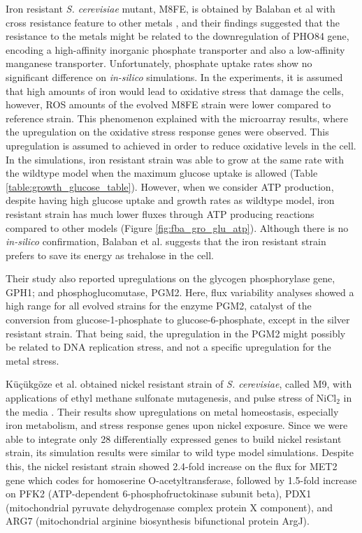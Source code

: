 Iron resistant \emph{S. cerevisiae} mutant, M8FE, is obtained by Balaban et al with cross resistance feature to other metals \cite{balaban2020evolutionary}, and their findings suggested that the resistance to the metals might be related to the downregulation of PHO84 gene, encoding a high-affinity inorganic phosphate transporter and also a low-affinity manganese transporter. Unfortunately, phosphate uptake rates show no significant difference on \emph{in-silico} simulations. In the experiments, it is assumed that high amounts of iron would lead to oxidative stress that damage the cells, however, ROS amounts of the evolved M8FE strain were lower compared to reference strain. This phenomenon explained with the microarray results, where the upregulation on the oxidative stress response genes were observed. This upregulation is assumed to achieved in order to reduce oxidative levels in the cell. In the simulations, iron resistant strain was able to grow at the same rate with the wildtype model when the maximum glucose uptake is allowed (Table \ref{table:growth_glucose_table}). However, when we consider ATP production, despite having high glucose uptake and growth rates as wildtype model, iron resistant strain has much lower fluxes through ATP producing reactions compared to other models (Figure \ref{fig:fba_gro_glu_atp}). Although there is no \emph{in-silico} confirmation, Balaban et al. suggests that the iron resistant strain prefers to save its energy as trehalose in the cell.

Their study also reported upregulations on the glycogen phosphorylase gene, GPH1; and phosphoglucomutase, PGM2. Here, flux variability analyses showed a high range for all evolved strains for the enzyme PGM2, catalyst of the conversion from glucose-1-phosphate to glucose-6-phosphate, except in the silver resistant strain. That being said, the upregulation in the PGM2 might possibly be related to DNA replication stress, and not a specific upregulation for the metal stress.

Küçükgöze et al. obtained nickel resistant strain of \emph{S. cerevisiae}, called M9, with applications of ethyl methane sulfonate mutagenesis, and pulse stress of NiCl$_2$ in the media \cite{kuccukgoze2013evolutionary}. Their results show upregulations on metal homeostasis, especially iron metabolism, and stress response genes upon nickel exposure. Since we were able to integrate only 28 differentially expressed genes to build nickel resistant strain, its simulation results were similar to wild type model simulations. Despite this, the nickel resistant strain showed 2.4-fold increase on the flux for MET2 gene which codes for homoserine O-acetyltransferase, followed by 1.5-fold increase on PFK2 (ATP-dependent 6-phosphofructokinase subunit beta), PDX1 (mitochondrial pyruvate dehydrogenase complex protein X component), and ARG7 (mitochondrial arginine biosynthesis bifunctional protein ArgJ).


